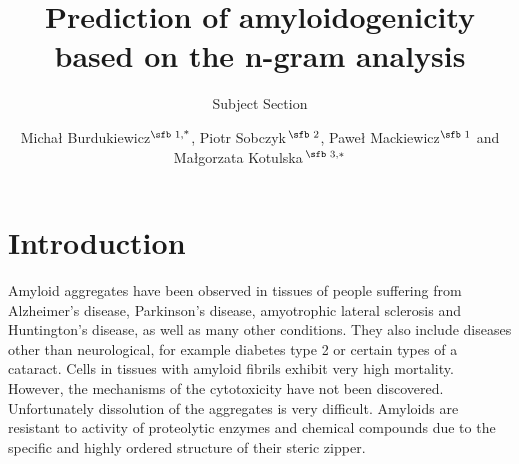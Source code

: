 \documentclass{bioinfo}
\begin{document}

\subtitle{Subject Section}

\title[Prediction of amyloidogenicity based on the n-gram analysis]{Prediction of amyloidogenicity based on the n-gram analysis}
\author[Sample \textit{et~al}.]{Micha\l{} Burdukiewicz$^{\text{\sfb 1,*}}$, Piotr Sobczyk\,$^{\text{\sfb 2}}$, Pawe\l{} Mackiewicz$^{\text{\sfb 1}}$ and Ma\l{}gorzata Kotulska\,$^{\text{\sfb 3,}*}$}
\address{$^{\text{\sf 1}}$University of Wroc\l{}aw, Department of Genomics,
$^{\text{\sf 2}}$Wroc\l{}aw University of Science and Technology, Department of Mathematics and 
$^{\text{\sf 3}}$Wroc\l{}aw University of Science and Technology, Department of Biomedical Engineering, Faculty of Fundamental Problems of Technology
}





\maketitle

\section{Introduction}


Amyloid aggregates have been observed in tissues of people suffering from 
Alzheimer's disease, Parkinson's disease, amyotrophic lateral sclerosis and 
Huntington's disease, as well as many other conditions. They also include 
diseases other than neurological, for example diabetes type 2 or certain types 
of a cataract. Cells in tissues with amyloid fibrils exhibit very high 
mortality. However, the mechanisms of the cytotoxicity have not been discovered. 
Unfortunately dissolution of the aggregates is very difficult. Amyloids are 
resistant to activity of proteolytic enzymes and chemical compounds due to the 
specific and highly ordered structure of their steric zipper.
\end{document}
